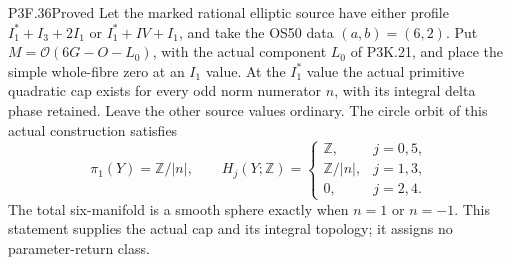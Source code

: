 \begin{statement}{P3F.36}{Proved}
Let the marked rational elliptic source have either profile
\(I_1^*+I_3+2I_1\) or \(I_1^*+IV+I_1\), and take the
OS50 data \((a,b)=(6,2)\). Put
\(M=\mathcal O(6G-O-L_0)\), with the actual component \(L_0\)
of P3K.21, and place the simple whole-fibre zero at an \(I_1\)
value. At the \(I_1^*\) value the actual primitive quadratic
cap exists for every odd norm numerator \(n\), with its integral
delta phase retained. Leave the other source values ordinary.
The circle orbit of this actual construction satisfies
\[
 \pi_1(Y)=\mathbb Z/|n|,\qquad
 H_j(Y;\mathbb Z)=
 \begin{cases}
 \mathbb Z,&j=0,5,\\
 \mathbb Z/|n|,&j=1,3,\\
 0,&j=2,4.
 \end{cases}
\]
The total six-manifold is a smooth sphere exactly when \(n=1\)
or \(n=-1\). This statement supplies the actual cap and its
integral topology; it assigns no parameter-return class.
\end{statement}


